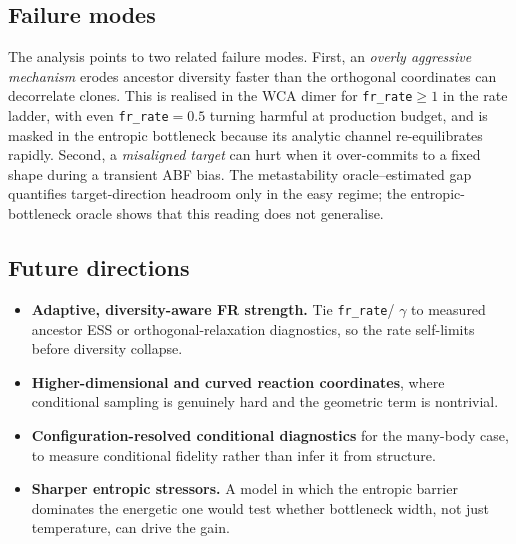\subsection{Failure modes}
The analysis points to two related failure modes. First, an \emph{overly
aggressive mechanism} erodes ancestor diversity faster than the orthogonal
coordinates can decorrelate clones. This is realised in the WCA dimer for
\texttt{fr\_rate}$\ge1$ in the rate ladder, with even \texttt{fr\_rate}$=0.5$
turning harmful at production budget, and is masked in the entropic bottleneck
because its analytic channel re-equilibrates rapidly. Second, a \emph{misaligned
target} can hurt when it over-commits to a fixed shape during a transient ABF
bias. The metastability oracle--estimated gap quantifies target-direction
headroom only in the easy regime; the entropic-bottleneck oracle shows that this
reading does not generalise.

\subsection{Future directions}
\begin{itemize}
  \item \textbf{Adaptive, diversity-aware FR strength.} Tie \texttt{fr\_rate}/
        $\gamma$ to measured ancestor ESS or orthogonal-relaxation diagnostics, so
        the rate self-limits before diversity collapse.
  \item \textbf{Higher-dimensional and curved reaction coordinates}, where
        conditional sampling is genuinely hard and the geometric term is
        nontrivial.
  \item \textbf{Configuration-resolved conditional diagnostics} for the many-body
        case, to measure conditional fidelity rather than infer it from structure.
  \item \textbf{Sharper entropic stressors.} A model in which the entropic barrier
        dominates the energetic one would test whether bottleneck width, not just
        temperature, can drive the gain.
\end{itemize}
